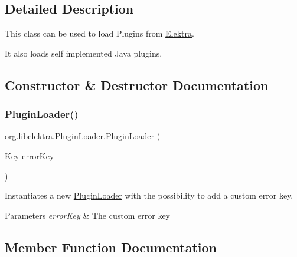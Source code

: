 \subsection{Detailed Description}
This class can be used to load Plugins from \hyperlink{interfaceorg_1_1libelektra_1_1Elektra}{Elektra}. 

It also loads self implemented Java plugins. 

\subsection{Constructor \& Destructor Documentation}
\mbox{\label{classorg_1_1libelektra_1_1PluginLoader_a4b09bcfc261043549a8f77d193fcf28a}} 
\subsubsection{\texorpdfstring{Plugin\+Loader()}{PluginLoader()}}
{\footnotesize\ttfamily org.\+libelektra.\+Plugin\+Loader.\+Plugin\+Loader (\begin{DoxyParamCaption}\item[{\hyperlink{classorg_1_1libelektra_1_1Key}{Key}}]{error\+Key }\end{DoxyParamCaption})\hspace{0.3cm}{\ttfamily [inline]}}



Instantiates a new \hyperlink{classorg_1_1libelektra_1_1PluginLoader}{Plugin\+Loader} with the possibility to add a custom error key. 


\begin{DoxyParams}{Parameters}
{\em error\+Key} & The custom error key \\
\hline
\end{DoxyParams}


\subsection{Member Function Documentation}
\mbox{\label{classorg_1_1libelektra_1_1PluginLoader_a0bf523c047b71f45a4f0cad2b3c7fb60}} 
